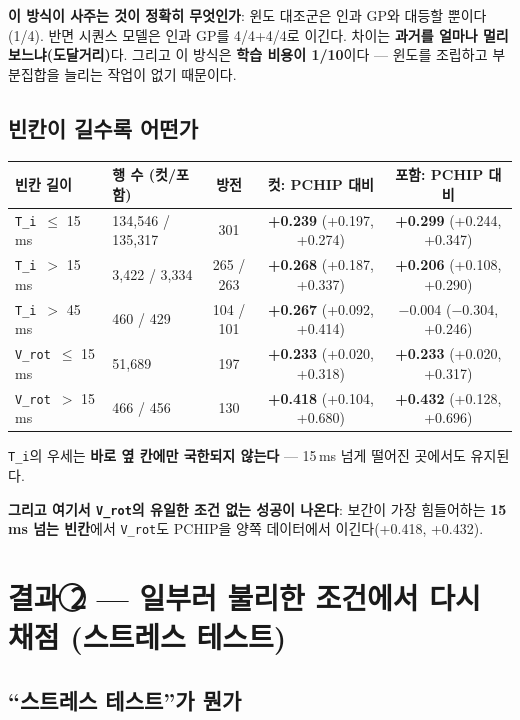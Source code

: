 \documentclass[10pt]{article}
\newcommand{\Ti}{\texttt{T\_i}}
\newcommand{\Vrot}{\texttt{V\_rot}}
\begin{document}
\textbf{이 방식이 사주는 것이 정확히 무엇인가}: 윈도 대조군은 인과 GP와 대등할 뿐이다(1/4).
반면 시퀀스 모델은 인과 GP를 4/4+4/4로 이긴다. 차이는 \textbf{과거를 얼마나 멀리
보느냐(도달거리)}다. 그리고 이 방식은 \textbf{학습 비용이 1/10}이다 --- 윈도를 조립하고
부분집합을 늘리는 작업이 없기 때문이다.

\subsection{빈칸이 길수록 어떤가}

\begin{center}
\begin{tabular}{@{}llccc@{}}
\toprule
\textbf{빈칸 길이} & \textbf{행 수 (컷/포함)} & \textbf{방전} & \textbf{컷: PCHIP 대비} &
  \textbf{포함: PCHIP 대비} \\
\midrule
\Ti\ $\le$ 15\,ms & 134{,}546 / 135{,}317 & 301 & \textbf{+0.239} (+0.197, +0.274) & \textbf{+0.299} (+0.244, +0.347) \\
\Ti\ $>$ 15\,ms & 3{,}422 / 3{,}334 & 265 / 263 & \textbf{+0.268} (+0.187, +0.337) & \textbf{+0.206} (+0.108, +0.290) \\
\Ti\ $>$ 45\,ms & 460 / 429 & 104 / 101 & \textbf{+0.267} (+0.092, +0.414) & $-$0.004 ($-$0.304, +0.246) \\
\Vrot\ $\le$ 15\,ms & 51{,}689 & 197 & \textbf{+0.233} (+0.020, +0.318) & \textbf{+0.233} (+0.020, +0.317) \\
\Vrot\ $>$ 15\,ms & 466 / 456 & 130 & \textbf{+0.418} (+0.104, +0.680) & \textbf{+0.432} (+0.128, +0.696) \\
\bottomrule
\end{tabular}
\end{center}

\Ti 의 우세는 \textbf{바로 옆 칸에만 국한되지 않는다} --- 15\,ms 넘게 떨어진 곳에서도
유지된다.

\textbf{그리고 여기서 \Vrot 의 유일한 조건 없는 성공이 나온다}: 보간이 가장 힘들어하는
\textbf{15\,ms 넘는 빈칸}에서 \Vrot 도 PCHIP을 양쪽 데이터에서 이긴다(+0.418, +0.432).

\section{결과 \textcircled{2} --- 일부러 불리한 조건에서 다시 채점 (스트레스 테스트)}

\subsection{``스트레스 테스트''가 뭔가}
\end{document}
